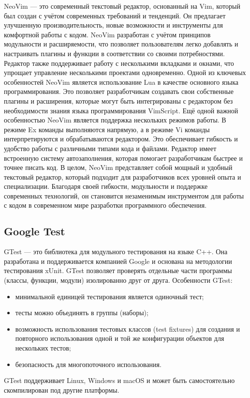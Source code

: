 NeoVim --- это современный текстовый редактор, основанный на Vim, который был создан с учётом современных требований и тенденций. Он предлагает улучшенную производительность, новые возможности и инструменты для комфортной работы с кодом.
NeoVim разработан с учётом принципов модульности и расширяемости, что позволяет пользователям легко добавлять и настраивать плагины и функции в соответствии со своими потребностями. Редактор также поддерживает работу с несколькими вкладками и окнами, что упрощает управление несколькими проектами одновременно.
Одной из ключевых особенностей NeoVim является использование Lua в качестве основного языка программирования. Это позволяет разработчикам создавать свои собственные плагины и расширения, которые могут быть интегрированы с редактором без необходимости знания языка программирования VimScript.
Ещё одной важной особенностью NeoVim является поддержка нескольких режимов работы. В режиме Ex команды выполняются напрямую, а в режиме Vi команды интерпретируются и обрабатываются редактором. Это обеспечивает гибкость и удобство работы с различными типами кода и файлами.
Редактор имеет встроенную систему автозаполнения, которая помогает разработчикам быстрее и точнее писать код.
В целом, NeoVim представляет собой мощный и удобный текстовый редактор, который подходит для разработчиков всех уровней опыта и специализации. Благодаря своей гибкости, модульности и поддержке современных технологий, он становится незаменимым инструментом для работы с кодом в современном мире разработки программного обеспечения.

\subsection{Google Test}
GTest --- это библиотека для модульного тестирования на языке C++. Она разработана и поддерживается компанией Google и основана на методологии тестирования xUnit. GTest позволяет проверять отдельные части программы (классы, функции, модули) изолированно друг от друга.
Особенности GTest:
\begin{itemize}
\item минимальной единицей тестирования является одиночный тест;
\item тесты можно объединять в группы (наборы);
\item возможность использования тестовых классов (test fixtures) для создания и повторного использования одной и той же конфигурации объектов для нескольких тестов;
\item безопасность для многопоточного использования.
\end{itemize}

GTest поддерживает Linux, Windows и macOS и может быть самостоятельно скомпилирован под другие платформы.
